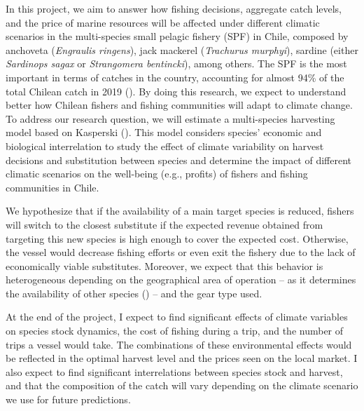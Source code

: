 \documentclass[
  11pt,
]{article}
\begin{document}
In this project, we aim to answer how fishing decisions, aggregate catch
levels, and the price of marine resources will be affected under
different climatic scenarios in the multi-species small pelagic fishery
(SPF) in Chile, composed by anchoveta (\emph{Engraulis ringens}), jack
mackerel (\emph{Trachurus murphyi}), sardine (either \emph{Sardinops
sagax} or \emph{Strangomera bentincki}), among others. The SPF is the
most important in terms of catches in the country, accounting for almost
94\% of the total Chilean catch in 2019
(). By doing this research,
we expect to understand better how Chilean fishers and fishing
communities will adapt to climate change. To address our research
question, we will estimate a multi-species harvesting model based on
Kasperski (). This model considers
species' economic and biological interrelation to study the effect of
climate variability on harvest decisions and substitution between
species and determine the impact of different climatic scenarios on the
well-being (e.g., profits) of fishers and fishing communities in Chile.

We hypothesize that if the availability of a main target species is
reduced, fishers will switch to the closest substitute if the expected
revenue obtained from targeting this new species is high enough to cover
the expected cost. Otherwise, the vessel would decrease fishing efforts
or even exit the fishery due to the lack of economically viable
substitutes. Moreover, we expect that this behavior is heterogeneous
depending on the geographical area of operation -- as it determines the
availability of other species () -- and the gear type used.

At the end of the project, I expect to find significant effects of
climate variables on species stock dynamics, the cost of fishing during
a trip, and the number of trips a vessel would take. The combinations of
these environmental effects would be reflected in the optimal harvest
level and the prices seen on the local market. I also expect to find
significant interrelations between species stock and harvest, and that
the composition of the catch will vary depending on the climate scenario
we use for future predictions.
\end{document}
